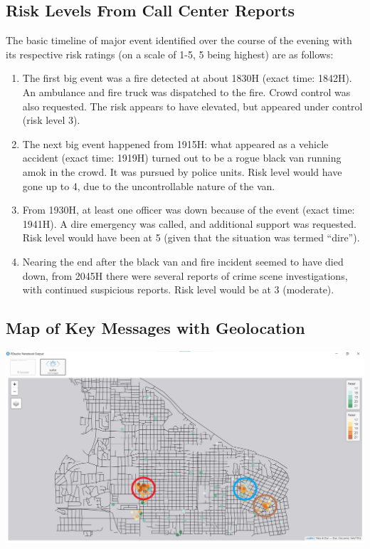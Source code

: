 \documentclass{acm_proc_article-sp}
\begin{document}
\hypertarget{risk-levels-from-call-center-reports}{%
\subsection{Risk Levels From Call Center
Reports}\label{risk-levels-from-call-center-reports}}

The basic timeline of major event identified over the course of the
evening with its respective risk ratings (on a scale of 1-5, 5 being
highest) are as follows:

\begin{enumerate}
\def\labelenumi{\arabic{enumi}.}
\item
  The first big event was a fire detected at about 1830H (exact time:
  1842H). An ambulance and fire truck was dispatched to the fire. Crowd
  control was also requested. The risk appears to have elevated, but
  appeared under control (risk level 3).
\item
  The next big event happened from 1915H: what appeared as a vehicle
  accident (exact time: 1919H) turned out to be a rogue black van
  running amok in the crowd. It was pursued by police units. Risk level
  would have gone up to 4, due to the uncontrollable nature of the van.
\item
  From 1930H, at least one officer was down because of the event (exact
  time: 1941H). A dire emergency was called, and additional support was
  requested. Risk level would have been at 5 (given that the situation
  was termed ``dire'').
\item
  Nearing the end after the black van and fire incident seemed to have
  died down, from 2045H there were several reports of crime scene
  investigations, with continued suspicious reports. Risk level would be
  at 3 (moderate).
\end{enumerate}

\hypertarget{map-of-key-messages-with-geolocation}{%
\subsection{Map of Key Messages with
Geolocation}\label{map-of-key-messages-with-geolocation}}

\includegraphics{img/image11.png}
\end{document}
